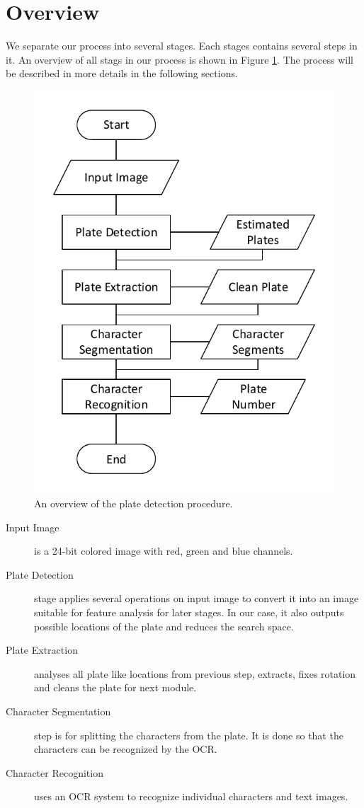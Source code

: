 \documentclass{standalone}
\begin{document}
\section{Overview}
We separate our process into several stages. Each stages contains several steps in it. An overview of all stags in our process is shown in Figure \ref{fig:ProcessOverview}. The process will be described in more details in the following sections.

\begin{figure} 
	\centering
	\includegraphics[width=0.65\linewidth]{./img/plots/overview}
	\caption{An overview of the plate detection procedure.} 
	\label{fig:ProcessOverview}
\end{figure}

\begin{description}
\item [Input Image] is a 24-bit colored image with red, green and blue channels.
\item [Plate Detection] stage applies several operations on input image to convert it into an image suitable for feature analysis for later stages. In our case, it also outputs possible locations of the plate and reduces the search space.
\item [Plate Extraction] analyses all plate like locations from previous step,  extracts, fixes rotation and cleans the plate for next module.
\item [Character Segmentation] step is for splitting the characters from the plate. It is done so that the characters can be recognized by the OCR.
\item [Character Recognition] uses an OCR system to recognize individual characters and text images.
\end{description}
\end{document}
